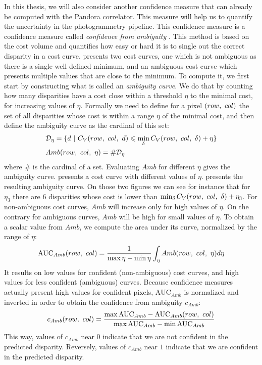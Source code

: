 In this thesis, we will also consider another confidence measure that can already be computed with the Pandora correlator. This measure will help us to quantify the uncertainty in the photogrammetry pipeline. This confidence measure is a confidence measure called \textit{confidence from ambiguity} \cite{sarrazin_ambiguity_2021}. This method is based on the cost volume and quantifies how easy or hard it is to single out the correct disparity in a cost curve.  presents two cost curves, one which is not ambiguous as there is a single well defined minimum, and an ambiguous cost curve which presents multiple values that are close to the minimum. To compute it, we first start by constructing what is called an \textit{ambiguity curve}. We do that by counting how many disparities have a cost close within a threshold $\eta$ to the minimal cost, for increasing values of $\eta$. Formally we need to define for a pixel $(row, ~col)$ the set of all disparities whose cost is within a range $\eta$ of the minimal cost, and then define the ambiguity curve as the cardinal of this set:
\begin{align}
    &\mathcal{D}_\eta = \{d ~|~ C_V(row,~col,~d) \leqslant \min_\delta C_V(row, ~col, ~\delta) + \eta\}\\
    &Amb(row, ~col, ~\eta) = \#\mathcal{D}_\eta
\end{align}
where $\#$ is the cardinal of a set. Evaluating $Amb$ for different $\eta$ gives the ambiguity curve.  presents a cost curve with different values of $\eta$.  presents the resulting ambiguity curve. On those two figures we can see for instance that for $\eta_3$ there are $6$ disparities whose cost is lower than $\min_\delta C_V(row, ~col, ~\delta) + \eta_3$. For non-ambiguous cost curves, $Amb$ will increase only for high values of $\eta$. On the contrary for ambiguous curves, $Amb$ will be high for small values of $\eta$. To obtain a scalar value from $Amb$, we compute the area under its curve, normalized by the range of $\eta$:
\begin{equation}
    \mathrm{AUC}_{Amb}(row, ~col) = \frac{1}{\max\eta-\min\eta}\int_\eta Amb(row,~col,~\eta)d\eta
\end{equation}
It results on low values for confident (non-ambiguous) cost curves, and high values for less confident (ambiguous) curves. Because confidence measures actually present high values for confident pixels, $\mathrm{AUC}_{Amb}$ is normalized and inverted in order to obtain the confidence from ambiguity $c_{Amb}$:
\begin{equation}\label{eq:confidence_from_ambiguity}
    c_{Amb}(row, ~col) = \frac{\max \mathrm{AUC}_{Amb}- \mathrm{AUC}_{Amb}(row, ~col)}{\max \mathrm{AUC}_{Amb} -\min \mathrm{AUC}_{Amb}}
\end{equation}
This way, values of $c_{Amb}$ near $0$ indicate that we are not confident in the predicted disparity. Reversely, values of $c_{Amb}$ near $1$ indicate that we are confident in the predicted disparity.

